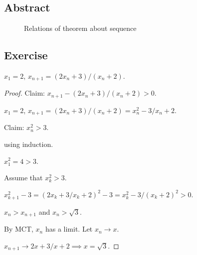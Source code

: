 \subsection{Abstract}

\begin{figure}[H]
  \centering
  \begin{tikzpicture}

  \end{tikzpicture}
  \caption{Relations of theorem about sequence}
  \label{fig:}
\end{figure}


\subsection{Exercise}

$x_1 = 2$, $x_{n+1} = (2x_n + 3) / (x_n + 2)$.
\begin{proof}
  Claim: $x_{n+1} - (2x_n + 3) / (x_n + 2) > 0$.

  $x_1 = 2$, $x_{n+1} = (2x_n + 3) / (x_n + 2)  = x_n^2 - 3 / x_n + 2$.

  Claim: $x_n^2 > 3$.

  using induction.

  $x_1^2 = 4 > 3$.

  Assume that $x_k^2 > 3$.

  $x_{k+1}^2 - 3 = (2x_k + 3 / x_k + 2)^2 - 3 = x_k^2 - 3 / (x_k + 2)^2 > 0$.

  $x_n > x_{n+1}$ and $x_n > \sqrt{3}$.

  By MCT, $x_n$ has a limit. Let $x_n \to x$.

  $x_{n+1} \to 2x + 3 / x + 2 \implies x = \sqrt{3}$.
\end{proof}